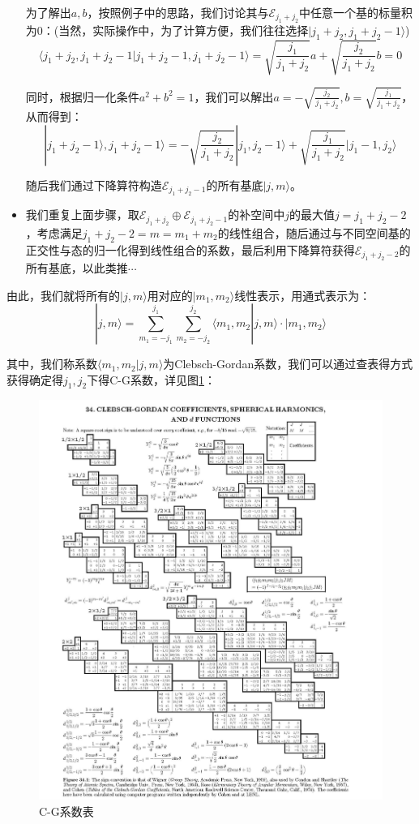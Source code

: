 \begin{itemize}
    为了解出$a,b$，按照例子中的思路，我们讨论其与$\mathcal{E}_{j_1+j_2}$中任意一个基的标量积为0：(当然，实际操作中，为了计算方便，我们往往选择$|j_1+j_2,j_1+j_2-1\rangle$)
    \begin{equation}
        \langle j_1+j_2,j_1+j_2-1|j_1+j_2-1,j_1+j_2-1\rangle=
        \sqrt{\frac{j_1}{j_1+j_2}}a+\sqrt{\frac{j_2}{j_1+j_2}}b=0
    \end{equation}
   
    同时，根据归一化条件$a^2+b^2=1$，我们可以解出$a=-\sqrt{\frac{j_2}{j_1+j_2}},b=\sqrt{\frac{j_1}{j_1+j_2}}$，从而得到：
    \begin{equation}
        |j_1+j_2-1\rangle,j_1+j_2-1\rangle=-\sqrt{\frac{j_2}{j_1+j_2}}|j_1,j_2-1\rangle+\sqrt{\frac{j_1}{j_1+j_2}}|j_1-1,j_2\rangle
    \end{equation}
    
    随后我们通过下降算符构造$\mathcal{E}_{j_1+j_2-1}$的所有基底$|j,m\rangle$。
    \item 我们重复上面步骤，取$\mathcal{E}_{j_1+j_2}\oplus\mathcal{E}_{j_1+j_2-1}$的补空间中$j$的最大值$j=j_1+j_2-2$，考虑满足$j_1+j_2-2=m=m_1+m_2$的线性组合，随后通过与不同空间基的正交性与态的归一化得到线性组合的系数，最后利用下降算符获得$\mathcal{E}_{j_1+j_2-2}$的所有基底，以此类推$\cdots$
\end{itemize}

由此，我们就将所有的$|j,m\rangle$用对应的$|m_1,m_2\rangle$线性表示，用通式表示为：
\begin{equation}
    |j,m\rangle=\sum_{m_1=-j_1}^{j_1}\sum_{m_2=-j_2}^{j_2}\langle m_1,m_2|j,m\rangle\cdot |m_1,m_2\rangle
\end{equation}

其中，我们称系数$\langle m_1,m_2|j,m\rangle$为Clebsch-Gordan系数，我们可以通过查表得方式获得确定得$j_1,j_2$下得C-G系数，详见图\ref{fig5:CGcoefficient}：
\begin{figure}[H]
    \centering
    \includegraphics[width=\textwidth]{figure/CGcoefficent.jpg}
    \caption{C-G系数表}
    \label{fig5:CGcoefficient}
\end{figure}
